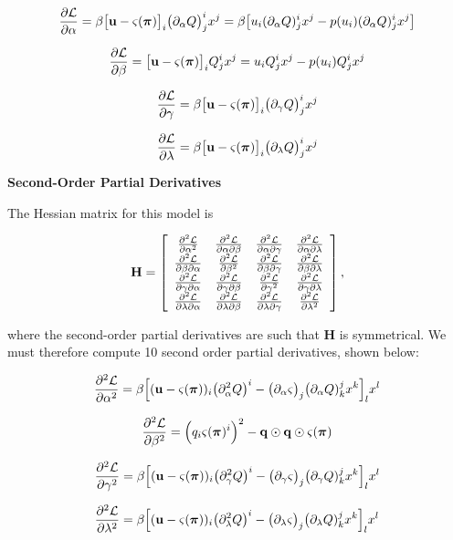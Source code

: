 \[
\frac{\partial \mathcal L}{\partial \alpha}  = \beta \big[\mathbf u - \varsigma(\boldsymbol\pi) \big]_i \big( \partial_\alpha Q \big)^i_j x^j   = \beta \big[ u_i (\partial_\alpha Q)^i_j x^j - p(u_i) (\partial_\alpha Q)^i_j x^j \big]
\]

\[
\frac{\partial \mathcal L}{\partial \beta}   =  \big[\mathbf u - \varsigma(\boldsymbol\pi)\big]_i Q^i_j x^j = u_i Q^i_j x^j - p(u_i) Q^i_j x^j
\]

\[
\frac{\partial \mathcal L}{\partial \gamma}  = \beta \big[\mathbf u - \varsigma(\boldsymbol\pi) \big]_i \big( \partial_\gamma Q \big)^i_j x^j
\]

\[
\frac{\partial \mathcal L}{\partial \lambda} = \beta \big[\mathbf u - \varsigma(\boldsymbol\pi) \big]_i \big( \partial_\lambda Q \big)^i_j x^j
\]

\textbf{Second-Order Partial Derivatives}

The Hessian matrix for this model is

\[
\mathbf H = \left[
\begin{array}{cccc}
\frac{\partial^2 \mathcal L}{\partial {\alpha}^2}                  & \frac{\partial^2 \mathcal L}{\partial \alpha \partial \beta}  & \frac{\partial^2 \mathcal L}{\partial \alpha \partial \gamma}  & \frac{\partial^2 \mathcal L}{\partial \alpha \partial \lambda} \\
\frac{\partial^2 \mathcal L}{\partial \beta \partial \alpha}   & \frac{\partial^2 \mathcal L}{\partial {\beta}^2}              & \frac{\partial^2 \mathcal L}{\partial \beta \partial \gamma}   & \frac{\partial^2 \mathcal L}{\partial \beta \partial \lambda}  \\
\frac{\partial^2 \mathcal L}{\partial \gamma \partial \alpha}  & \frac{\partial^2 \mathcal L}{\partial \gamma \partial \beta}  & \frac{\partial^2 \mathcal L}{\partial {\gamma}^2}                  & \frac{\partial^2 \mathcal L}{\partial \gamma \partial \lambda} \\
\frac{\partial^2 \mathcal L}{\partial \lambda \partial \alpha} & \frac{\partial^2 \mathcal L}{\partial \lambda \partial \beta} & \frac{\partial^2 \mathcal L}{\partial \lambda \partial \gamma} & \frac{\partial^2 \mathcal L}{\partial {\lambda}^2}                 \\
\end{array}\right],
\]

where the second-order partial derivatives are such that \(\mathbf H\)
is symmetrical. We must therefore compute 10 second order partial
derivatives, shown below:

\[
\frac{\partial^2 \mathcal L}{\partial {\alpha}^2} = \beta \Big[ (\mathbf u - \varsigma(\boldsymbol\pi))_i \big( \partial^2_\alpha Q \big)^i - \big( \partial_\alpha \varsigma \big)_j \big( \partial_\alpha Q)^j_k x^k \Big]_l x^l
\]

\[
\frac{\partial^2 \mathcal L}{\partial {\beta}^2} = \Big( q_i \varsigma(\boldsymbol\pi)^i \Big)^2 - \mathbf q \odot \mathbf q \odot \varsigma(\boldsymbol\pi)
\]

\[
\frac{\partial^2 \mathcal L}{\partial {\gamma}^2}  = \beta \Big[ (\mathbf u - \varsigma(\boldsymbol\pi))_i \big( \partial^2_\gamma Q \big)^i - \big( \partial_\gamma \varsigma \big)_j \big( \partial_\gamma Q)^j_k x^k \Big]_l x^l
\]

\[
\frac{\partial^2 \mathcal L}{\partial {\lambda}^2}  = \beta \Big[ (\mathbf u - \varsigma(\boldsymbol\pi))_i \big( \partial^2_\lambda Q \big)^i - \big( \partial_\lambda \varsigma \big)_j \big( \partial_\lambda Q)^j_k x^k \Big]_l x^l
\]

